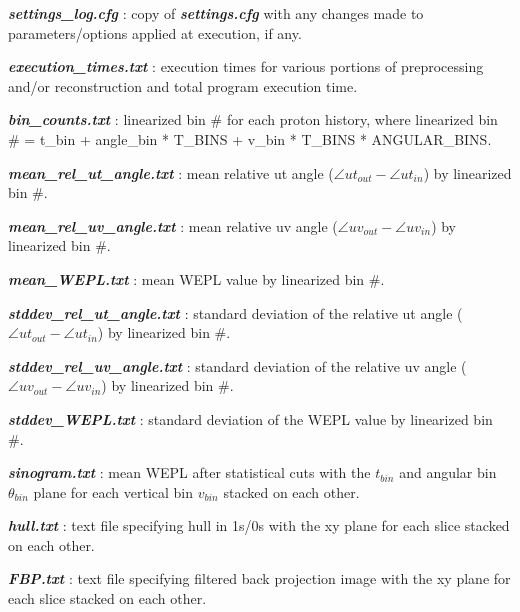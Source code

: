 \documentclass[landscape]{article}
\begin{document}
\begin{myEnumerate}[labelindent=0pt, leftmargin=*]
\begin{myEnumerate}[labelindent=1pt, leftmargin=*]
\begin{myEnumerate}[labelindent=1pt, leftmargin=*]
\begin{myEnumerate}[labelindent=1pt, leftmargin=*]
\begin{myEnumerate}[labelindent=1pt, leftmargin=*]
\begin{myEnumerate}[labelindent=1pt, leftmargin=*]
\begin{myEnumerate}[labelindent=1pt, leftmargin=*]
\begin{myEnumerate}[labelindent=1pt, leftmargin=*]
\begin{myEnumerate}[labelindent=1pt, leftmargin=*]
                                    \item \textbf{\textit{settings\_log.cfg}} : copy of \textbf{\textit{settings.cfg}} with any changes made to parameters/options applied at execution, if any.
                                    \item \textbf{\textit{execution\_times.txt}} : execution times for various portions of preprocessing and/or reconstruction and total program execution time.
                                    \item \textbf{\textit{bin\_counts.txt}} : linearized bin \# for each proton history, where linearized bin \# = t\_bin + angle\_bin * T\_BINS + v\_bin * T\_BINS * ANGULAR\_BINS.
                                    \item \textbf{\textit{mean\_rel\_ut\_angle.txt}} : mean relative ut angle ($\angle ut_{out} -\angle ut_{in}$) by linearized bin \#.
                                    \item \textbf{\textit{mean\_rel\_uv\_angle.txt}} : mean relative uv angle ($\angle uv_{out} -\angle uv_{in}$) by linearized bin \#.
                                    \item \textbf{\textit{mean\_WEPL.txt}} : mean WEPL value by linearized bin \#.
                                    \item \textbf{\textit{stddev\_rel\_ut\_angle.txt}} : standard deviation of the relative ut angle ($\angle ut_{out} -\angle ut_{in}$) by linearized bin \#.
                                    \item \textbf{\textit{stddev\_rel\_uv\_angle.txt}} : standard deviation of the relative uv angle ($\angle uv_{out} -\angle uv_{in}$) by linearized bin \#.
                                    \item \textbf{\textit{stddev\_WEPL.txt}} : standard deviation of the WEPL value by linearized bin \#.
                                    \item \textbf{\textit{sinogram.txt}} : mean WEPL after statistical cuts with the $t_{bin}$ and angular bin $\theta_{bin}$ plane for each vertical bin $v_{bin}$ stacked on each other.
                                    \item \textbf{\textit{hull.txt}} : text file specifying hull in 1s/0s with the xy plane for each slice stacked on each other.
                                    \item \textbf{\textit{FBP.txt}} : text file specifying filtered back projection image with the xy plane for each slice stacked on each other.

\end{myEnumerate}
\end{myEnumerate}
\end{myEnumerate}
\end{myEnumerate}
\end{myEnumerate}
\end{myEnumerate}
\end{myEnumerate}
\end{myEnumerate}
\end{myEnumerate}
\end{document}
